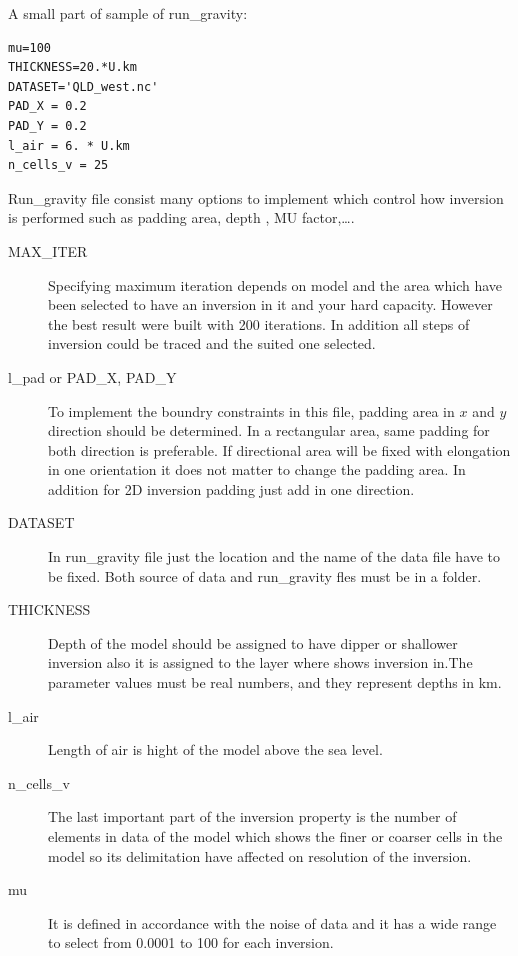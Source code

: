 A small part of sample of run_gravity:\\
\begin{verbatim}
mu=100
THICKNESS=20.*U.km
DATASET='QLD_west.nc'
PAD_X = 0.2
PAD_Y = 0.2
l_air = 6. * U.km
n_cells_v = 25
\end{verbatim}

Run_gravity file consist many options to implement which control how inversion is performed such as padding area, depth , MU factor,\ldots.

\begin{description} 	
\item[MAX\_ITER]
Specifying maximum iteration depends on model and the area which have been selected to have an inversion in it and your hard capacity. However the best result were built with 200 iterations. In addition all steps of inversion could be traced and the suited one selected.

\item[l_pad or PAD\_X, PAD\_Y] To implement the boundry constraints in this file, padding area in $x$ and $y$ direction should be determined. In a rectangular area, same padding for both direction is preferable. If directional area will be fixed with elongation in one orientation it does not matter to change the padding area. In addition for 2D inversion padding just add in one direction.

\item[DATASET] In run_gravity file just the location and the name of the data file have to be fixed. Both source of data and run_gravity fles must be in a folder. 

\item[THICKNESS] Depth of the model should be assigned to have dipper or shallower inversion also it is assigned to the layer where shows inversion in.The parameter values must be real numbers, and they represent depths in km.

\item[l_air] Length of air is hight of the model above the sea level. 

\item[n_cells_v] The last important part of the inversion property is the number of elements in data of the model which shows the finer or coarser cells in the model so its delimitation have affected on resolution of the inversion.

\item[mu]It is defined in accordance with the noise of data and it has a wide range to select from 0.0001 to 100 for each inversion.

\end{description}

